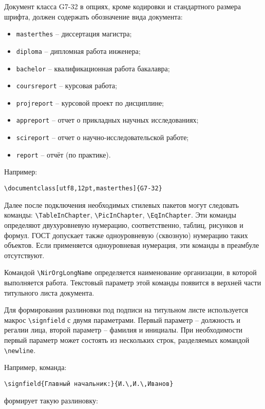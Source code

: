 \documentclass[utf8,12pt, coursreport]{G7-32}
\begin{document}
Документ класса G7-32 в опциях, кроме кодировки и стандартного размера шрифта, должен содержать обозначение вида документа:
\begin{itemize}
\item \texttt{masterthes} -- диссертация магистра;
\item \texttt{diploma} -- дипломная работа инженера;
\item \texttt{bachelor} -- квалификационная работа бакалавра;
\item \texttt{coursreport} -- курсовая работа;
\item \texttt{projreport} -- курсовой проект по дисциплине;
\item \texttt{appreport} -- отчет о прикладных научных исследованиях;
\item \texttt{scireport} -- отчет о научно-исследовательской работе;
\item \texttt{report} -- отчёт (по практике).
\end{itemize}

Например:
\begin{verbatim}
\documentclass[utf8,12pt,masterthes]{G7-32}
\end{verbatim}

Далее после подключения необходимых стилевых пакетов могут следовать команды:
\verb|\TableInChapter|, \verb|\PicInChapter|, \verb|\EqInChapter|. Эти команды определяют двухуровневую нумерацию, соответственно, таблиц, рисунков и формул. ГОСТ допускает также одноуровневую (сквозную) нумерацию таких объектов. Если применяется одноуровневая нумерация, эти команды в преамбуле отсутствуют.

Командой \verb|\NirOrgLongName| определяется наименование организации, в которой выполняется работа. Текстовый параметр этой команды появится в верхней части титульного листа документа.

Для формирования разлиновки под подписи на титульном листе используется макрос \verb|\signfield| с двумя параметрами. Первый параметр -- должность и регалии лица, второй параметр -- фамилия и инициалы. При необходимости первый параметр может состоять из нескольких строк, разделяемых командой \verb|\newline|.

Например, команда:
\begin{verbatim}
\signfield{Главный начальник:}{И.\,И.\,Иванов}
\end{verbatim}
формирует такую разлиновку:
\begin{center}
\end{center}
\end{document}
